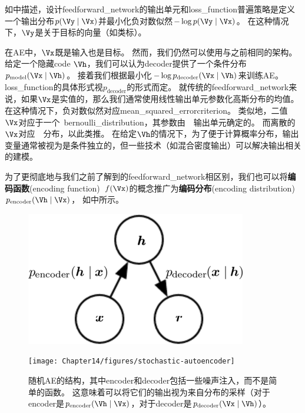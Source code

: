 如中描述，设计\gls{feedforward_network}的输出单元和\gls{loss_function}普遍策略是定义一个输出分布$p(\Vy \mid \Vx) $并最小化负对数似然$-\log p(\Vy \mid \Vx)$。
在这种情况下，$\Vy$是关于目标的向量（如类标）。


在\gls{AE}中，$\Vx$既是输入也是目标。
然而，我们仍然可以使用与之前相同的架构。
给定一个隐藏\gls{code} $\Vh$，我们可以认为\gls{decoder}提供了一个条件分布$p_{\text{model}}(\Vx \mid \Vh)$。
接着我们根据最小化$-\log p_{\text{decoder}}(\Vx \mid \Vh)$来训练\gls{AE}。
\gls{loss_function}的具体形式视$p_{\text{decoder}}$的形式而定。
就传统的\gls{feedforward_network}来说，如果$\Vx$是实值的，那么我们通常使用线性输出单元参数化高斯分布的均值。
在这种情况下，负对数似然对应\gls{mean_squared_error}\gls{criterion}。
类似地，二值$\Vx$对应于一个~\gls{bernoulli_distribution}，其参数由~~输出单元确定的。
而离散的$\Vx$对应~~分布，以此类推。
在给定$\Vh$的情况下，为了便于计算概率分布，输出变量通常被视为是条件独立的，但一些技术（如混合密度输出）可以解决输出相关的建模。


为了更彻底地与我们之前了解到的\gls{feedforward_network}相区别，我们也可以将\textbf{编码函数}(encoding function)~$f(\Vx)$的概念推广为\textbf{编码分布}(encoding distribution)~$ p_{\text{encoder}}(\Vh \mid \Vx)$， 如中所示。

\begin{figure}[!htb]
\ifOpenSource
\centerline{\includegraphics[scale=0.5]{images/119.png}}
\else
\centerline{\texttt{[image: Chapter14/figures/stochastic-autoencoder]}}
\fi
\caption{随机\gls{AE}的结构，其中\gls{encoder}和\gls{decoder}包括一些噪声注入，而不是简单的函数。
这意味着可以将它们的输出视为来自分布的采样（对于\gls{encoder}是$p_{\text{encoder}}(\Vh \mid \Vx)$，对于\gls{decoder}是$p_{\text{decoder}}(\Vx\mid \Vh)$）。}
\label{fig:chap14_stochastic-autoencoder}
\end{figure}

